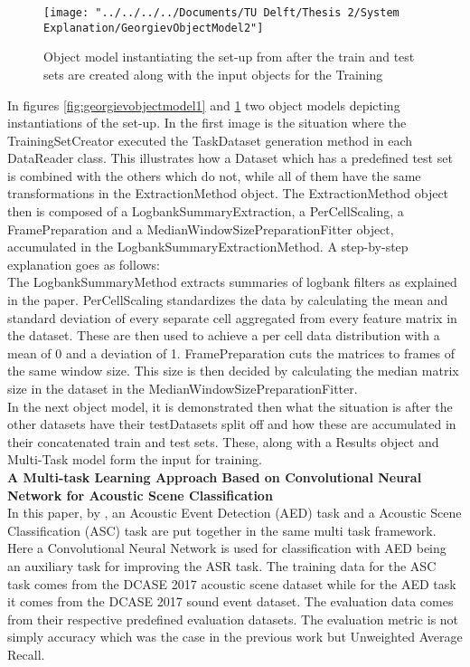\begin{figure}
	\centering
	\texttt{[image: "../../../../Documents/TU Delft/Thesis 2/System Explanation/GeorgievObjectModel2"]}
	\caption{Object model instantiating the set-up from \citet{georgiev2017low} after the train and test sets are created along with the input objects for the Training}
	\label{fig:georgievobjectmodel2}
\end{figure}


In figures \ref{fig:georgievobjectmodel1} and \ref{fig:georgievobjectmodel2} two object models depicting instantiations of the set-up. In the first image is the situation where the TrainingSetCreator executed the TaskDataset generation method in each DataReader class. This illustrates how a Dataset which has a predefined test set is combined with the others which do not, while all of them have the same transformations in the ExtractionMethod object. The ExtractionMethod object then is composed of a LogbankSummaryExtraction, a PerCellScaling, a FramePreparation and a MedianWindowSizePreparationFitter object, accumulated in the LogbankSummaryExtractionMethod. A step-by-step explanation goes as follows:\\

The LogbankSummaryMethod extracts summaries of logbank filters as explained in the paper. PerCellScaling standardizes the data by calculating the mean and standard deviation of every separate cell aggregated from every feature matrix in the dataset. These are then used to achieve a per cell data distribution with a mean of 0 and a deviation of 1. FramePreparation cuts the matrices to frames of the same window size. This size is then decided by calculating the median matrix size in the dataset in the MedianWindowSizePreparationFitter. \\
 
In the next object model, it is demonstrated then what the situation is after the other datasets have their testDatasets split off and how these are accumulated in their concatenated train and test sets. These, along with a Results object and Multi-Task model form the input for training.\\


{\large \textbf{A Multi-task Learning Approach Based on Convolutional Neural Network for Acoustic Scene Classification}} \\

In this paper, by \citet{xu2019multi}, an Acoustic Event Detection (AED) task and a Acoustic Scene Classification (ASC) task are put together in the same multi task framework. Here a Convolutional Neural Network is used for classification with AED being an auxiliary task for improving the ASR task. The training data for the ASC task comes from the DCASE 2017 acoustic scene dataset while for the AED task it comes from the DCASE 2017 sound event dataset. The evaluation data comes from their respective predefined evaluation datasets. The evaluation metric is not simply accuracy which was the case in the previous work but Unweighted Average Recall.\\

